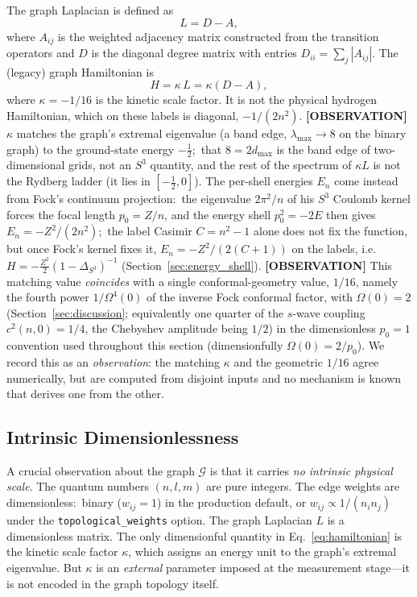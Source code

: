 \documentclass[aps,pra,twocolumn,superscriptaddress,longbibliography]{revtex4-2}
\begin{document}
The graph Laplacian is defined as
\begin{equation}
L = D - A,
\label{eq:laplacian}
\end{equation}
where $A_{ij}$ is the weighted adjacency matrix constructed from the transition operators and $D$ is the diagonal degree matrix with entries $D_{ii} = \sum_j |A_{ij}|$. The (legacy) graph Hamiltonian is
\begin{equation}
H = \kappa\, L = \kappa(D - A),
\label{eq:hamiltonian}
\end{equation}
where $\kappa = -1/16$ is the kinetic scale factor.  It is not the physical hydrogen Hamiltonian, which on these labels is diagonal, $-1/(2n^2)$.  \textbf{[OBSERVATION]} $\kappa$ matches the graph's extremal eigenvalue (a band edge, $\lambda_{\max} \to 8$ on the binary graph) to the ground-state energy $-\tfrac12$;\ that $8 = 2 d_{\max}$ is the band edge of two-dimensional grids, not an $S^3$ quantity, and the rest of the spectrum of $\kappa L$ is not the Rydberg ladder (it lies in $[-\tfrac12, 0]$).  The per-shell energies $E_n$ come instead from Fock's continuum projection:\ the eigenvalue $2\pi^2/n$ of his $S^3$ Coulomb kernel forces the focal length $p_0 = Z/n$, and the energy shell $p_0^2 = -2E$ then gives $E_n = -Z^2/(2n^2)$;\ the label Casimir $C = n^2 - 1$ alone does not fix the function, but once Fock's kernel fixes it, $E_n = -Z^2/(2(C+1))$ on the labels, i.e.\ $H = -\tfrac{Z^2}{2}(1-\Delta_{S^3})^{-1}$ (Section~\ref{sec:energy_shell}).  \textbf{[OBSERVATION]} This matching value \emph{coincides} with a single conformal-geometry value, $1/16$, namely the fourth power $1/\Omega^4(0)$ of the inverse Fock conformal factor, with $\Omega(0) = 2$ (Section~\ref{sec:discussion}; equivalently one quarter of the $s$-wave coupling $c^2(n,0) = 1/4$, the Chebyshev amplitude being $1/2$) in the dimensionless $p_0 = 1$ convention used throughout this section (dimensionfully $\Omega(0) = 2/p_0$).  We record this as an \emph{observation}: the matching $\kappa$ and the geometric $1/16$ agree numerically, but are computed from disjoint inputs and no mechanism is known that derives one from the other.

\subsection{Intrinsic Dimensionlessness}

A crucial observation about the graph $\mathcal{G}$ is that it carries \textit{no intrinsic physical scale}. The quantum numbers $(n, l, m)$ are pure integers. The edge weights are dimensionless:\ binary ($w_{ij} = 1$) in the production default, or $w_{ij} \propto 1/(n_i n_j)$ under the \texttt{topological\_weights} option. The graph Laplacian $L$ is a dimensionless matrix. The only dimensionful quantity in Eq.~\eqref{eq:hamiltonian} is the kinetic scale factor $\kappa$, which assigns an energy unit to the graph's extremal eigenvalue. But $\kappa$ is an \textit{external} parameter imposed at the measurement stage---it is not encoded in the graph topology itself.
\end{document}
